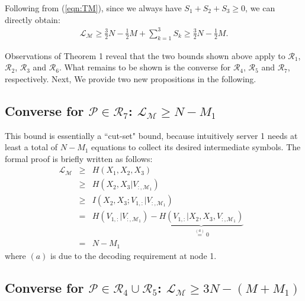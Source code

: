 \documentclass[conference]{IEEEtran}
\begin{document}
Following from (\ref{eqn:TM}), since we always have $S_1+S_2+S_3\geq 0$, we can directly obtain:
\begin{eqnarray}
{\mathcal L}_{\mathcal M}\geq \frac{3}{2}N-\frac{1}{2}M+\sum_{k=1}^3 S_k\geq \frac{3}{2}N-\frac{1}{2}M.
\end{eqnarray}

Observations of Theorem 1 reveal that the two bounds shown above apply to $\mathcal{R}_1$, $\mathcal{R}_2$, $\mathcal{R}_3$ and $\mathcal{R}_6$. What remains to be shown is the converse for $\mathcal{R}_4$, $\mathcal{R}_5$ and $\mathcal{R}_7$, respectively. Next, We provide two new propositions in the following.

\subsection{Converse for ${\mathcal P}\in{\mathcal R}_7$: ${\mathcal L}_{\mathcal M}\geq N-M_1$}


This bound is essentially a ``cut-set" bound, because intuitively server 1 needs at least a total of $N-M_1$ equations to collect its desired intermediate symbols. The formal proof is briefly written as follows:
\begin{eqnarray}
{\mathcal L}_{\mathcal M}&\!\!\!\!\geq \!\!\!\!& H(X_1,X_2,X_3) \\
&\!\!\!\!\geq \!\!\!\!&  H(X_2,X_3|V_{:,\mathcal{M}_1})\\
&\!\!\!\!\geq \!\!\!\!& I(X_2,X_3;V_{1,:}|V_{:,\mathcal{M}_1})\label{eqn:bound3_decode}\\
&\!\!\!\!=\!\!\!\!& H(V_{1,:}|V_{:,\mathcal{M}_1})-\underbrace{H(V_{1,:}|X_2,X_3,V_{:,\mathcal{M}_1})}_{\overset{(a)}{=}0}\ \ \ \\
&\!\!\!\!=\!\!\!\!&N-M_1
\end{eqnarray}
where $(a)$ is due to the decoding requirement at node 1.


\subsection{Converse for ${\mathcal P}\in{\mathcal R}_4\cup{\mathcal R}_5$: ${\mathcal L}_{\mathcal M}\geq 3N-(M+M_1)$}

\end{document}

